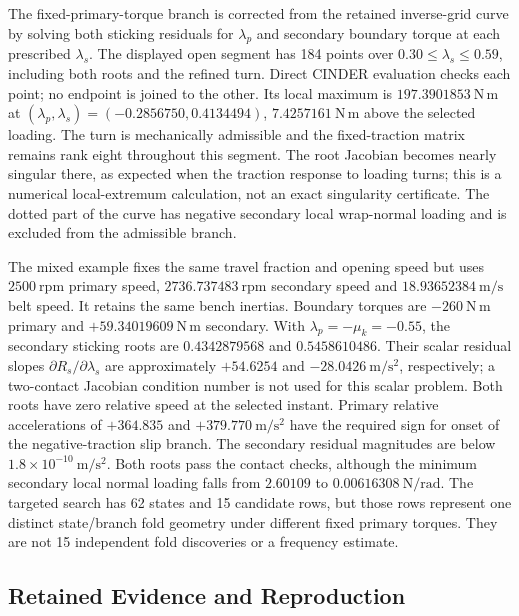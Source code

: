 \documentclass[11pt]{report}
\numberwithin{equation}{section}
\begin{document}
The fixed-primary-torque branch is corrected from the retained inverse-grid
curve by solving both sticking residuals for \(\lambda_p\) and secondary
boundary torque at each prescribed \(\lambda_s\). The displayed open
segment has 184 points over \(0.30\leq\lambda_s\leq0.59\), including both
roots and the refined turn. Direct CINDER evaluation checks each point;
no endpoint is joined to the other. Its local maximum is
\(197.3901853~\mathrm{N\,m}\) at
\((\lambda_p,\lambda_s)=(-0.2856750,0.4134494)\),
\(7.4257161~\mathrm{N\,m}\) above the selected loading.
The turn is mechanically admissible and the fixed-traction matrix remains
rank eight throughout this segment. The root Jacobian becomes nearly
singular there, as expected when the traction response to loading turns;
this is a numerical local-extremum calculation, not an exact singularity
certificate. The dotted part of the curve has negative secondary local
wrap-normal loading and is excluded from the admissible branch.

The mixed example fixes the same travel fraction and opening speed but
uses \(2500~\mathrm{rpm}\) primary speed,
\(2736.737483~\mathrm{rpm}\) secondary speed and
\(18.93652384~\mathrm{m/s}\) belt speed. It retains the same bench
inertias. Boundary torques are \(-260~\mathrm{N\,m}\) primary and
\(+59.34019609~\mathrm{N\,m}\) secondary. With
\(\lambda_p=-\mu_k=-0.55\), the secondary sticking roots are
\(0.4342879568\) and \(0.5458610486\). Their scalar residual slopes
\(\partial R_s/\partial\lambda_s\) are approximately
\(+54.6254\) and \(-28.0426~\mathrm{m/s^2}\), respectively; a two-contact
Jacobian condition number is not used for this scalar problem.
Both roots have zero relative speed at the selected instant. Primary
relative accelerations of \(+364.835\) and
\(+379.770~\mathrm{m/s^2}\) have the required sign for onset of the
negative-traction slip branch. The secondary residual magnitudes are
below \(1.8\times10^{-10}~\mathrm{m/s^2}\).
Both roots pass the contact checks, although the minimum secondary local
normal loading falls from \(2.60109\) to
\(0.00616308~\mathrm{N/rad}\). The targeted search has 62 states and
15 candidate rows, but those rows represent one distinct state/branch
fold geometry under different fixed primary torques. They are not 15
independent fold discoveries or a frequency estimate.
\FloatBarrier

\subsection{Retained Evidence and Reproduction}
\end{document}
